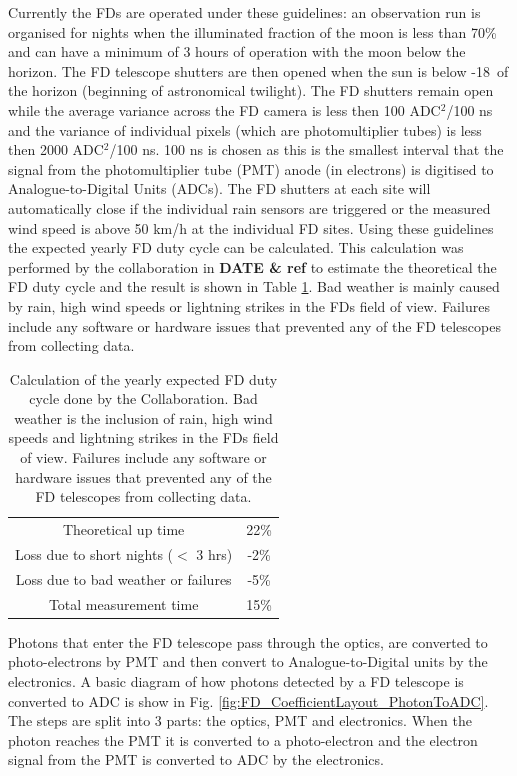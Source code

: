 Currently the FDs are operated under these guidelines: an observation run is organised for nights when the illuminated fraction of the moon is less than 70\% and can have a minimum of 3 hours of operation with the moon below the horizon. The FD telescope shutters are then opened when the sun is below -18\textdegree \ of the horizon (beginning of astronomical twilight). The FD shutters remain open while the average variance across the FD camera is less then 100 ADC$^2$/100 ns and the variance of individual pixels (which are photomultiplier tubes) is less then 2000 ADC$^2$/100 ns. 100 ns is chosen as this is the smallest interval that the signal from the photomultiplier tube (PMT) anode (in electrons) is digitised to Analogue-to-Digital Units (ADCs). The FD shutters at each site will automatically close if the individual rain sensors are triggered or the measured wind speed is above 50 km/h at the individual FD sites. Using these guidelines the expected yearly FD duty cycle can be calculated. This calculation was performed by the collaboration in \textbf{DATE \& ref} to estimate the theoretical the FD duty cycle and the result is shown in Table \ref{tab:FD_uptime}. Bad weather is mainly caused by rain, high wind speeds or lightning strikes in the FDs field of view. Failures include any software or hardware issues that prevented any of the FD telescopes from collecting data.

\begin{table}[h]
\centering
\begin{tabular}{ c c }
\hline\hline
Theoretical up time & 22\% \\
Loss due to short nights ($<$ 3 hrs) & -2\% \\
Loss due to bad weather or failures & -5\% \\ \hline \hline
Total measurement time & 15\% \\
\hline\hline
\end{tabular}
\caption{Calculation of the yearly expected FD duty cycle done by the Collaboration. Bad weather is the inclusion of rain, high wind speeds and lightning strikes in the FDs field of view. Failures include any software or hardware issues that prevented any of the FD telescopes from collecting data.} \label{tab:FD_uptime}
\end{table}


Photons that enter the FD telescope pass through the optics, are converted to photo-electrons by PMT and then convert to Analogue-to-Digital units by the electronics. A basic diagram of how photons detected by a FD telescope is converted to ADC is show in Fig. \ref{fig:FD_CoefficientLayout_PhotonToADC}. The steps are split into 3 parts: the optics, PMT and electronics. When the photon reaches the PMT it is converted to a photo-electron and the electron signal from the PMT is converted to ADC by the electronics. 

